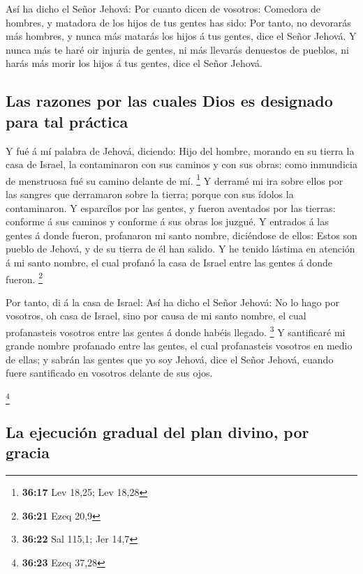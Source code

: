  Así ha dicho el Señor Jehová: Por cuanto dicen de
vosotros: Comedora de hombres, y matadora de los hijos de tus gentes has
sido:  Por tanto, no devorarás más hombres, y nunca más
matarás los hijos á tus gentes, dice el Señor Jehová.  Y
nunca más te haré oir injuria de gentes, ni más llevarás denuestos de
pueblos, ni harás más morir los hijos á tus gentes, dice el Señor
Jehová.

\hypertarget{las-razones-por-las-cuales-dios-es-designado-para-tal-pruxe1ctica}{%
\subsection{Las razones por las cuales Dios es designado para tal
práctica}\label{las-razones-por-las-cuales-dios-es-designado-para-tal-pruxe1ctica}}

 Y fué á mí palabra de Jehová, diciendo:  Hijo
del hombre, morando en su tierra la casa de Israel, la contaminaron con
sus caminos y con sus obras: como inmundicia de menstruosa fué su camino
delante de mí. \footnote{\textbf{36:17} Lev 18,25; Lev 18,28}
 Y derramé mi ira sobre ellos por las sangres que
derramaron sobre la tierra; porque con sus ídolos la contaminaron.
 Y esparcílos por las gentes, y fueron aventados por las
tierras: conforme á sus caminos y conforme á sus obras los juzgué.
 Y entrados á las gentes á donde fueron, profanaron mi
santo nombre, diciéndose de ellos: Estos son pueblo de Jehová, y de su
tierra de él han salido.  Y he tenido lástima en atención á
mi santo nombre, el cual profanó la casa de Israel entre las gentes á
donde fueron. \footnote{\textbf{36:21} Ezeq 20,9}

 Por tanto, di á la casa de Israel: Así ha dicho el Señor
Jehová: No lo hago por vosotros, oh casa de Israel, sino por causa de mi
santo nombre, el cual profanasteis vosotros entre las gentes á donde
habéis llegado. \footnote{\textbf{36:22} Sal 115,1; Jer 14,7}
 Y santificaré mi grande nombre profanado entre las gentes,
el cual profanasteis vosotros en medio de ellas; y sabrán las gentes que
yo soy Jehová, dice el Señor Jehová, cuando fuere santificado en
vosotros delante de sus ojos.

\footnote{\textbf{36:23} Ezeq 37,28}

\hypertarget{la-ejecuciuxf3n-gradual-del-plan-divino-por-gracia}{%
\subsection{La ejecución gradual del plan divino, por
gracia}\label{la-ejecuciuxf3n-gradual-del-plan-divino-por-gracia}}

